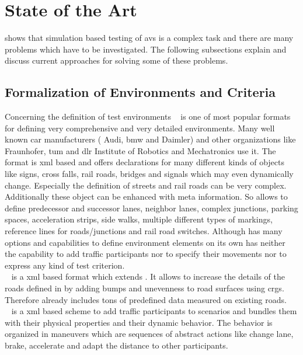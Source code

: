 \section{State of the Art}\label{sec:stateOfTheArt}
 shows that simulation based testing of \glspl{av} is a complex task and there are many problems which have to be investigated.
The following subsections explain and discuss current approaches for solving some of these problems.

\subsection{Formalization of Environments and Criteria}
Concerning the definition of test environments \opendrive{}~\cite{openDrive} is one of most popular formats for defining very comprehensive and very detailed environments.
Many well known car manufacturers (\eg{} Audi, \gls{bmw} and Daimler) and other organizations like Fraunhofer, \gls{tum} and \gls{dlr} Institute of Robotics and Mechatronics use it.
The format is \gls{xml} based and offers declarations for many different kinds of objects like signs, cross falls, rail roads, bridges and signals which may even dynamically change.
Especially the definition of streets and rail roads can be very complex.
Additionally these object can be enhanced with meta information.
So \opendrive{} allows to define predecessor and successor lanes, neighbor lanes, complex junctions, parking spaces, acceleration strips, side walks, multiple different types of markings, reference lines for roads/junctions and rail road switches.
Although \opendrive{} has many options and capabilities to define environment elements \opendrive{} on its own has neither the capability to add traffic participants nor to specify their movements nor to express any kind of test criterion.\\
\opencrg{}~\cite{openCrg} is a \gls{xml} based format which extends \opendrive{}.
It allows to increase the details of the roads defined in \opendrive{} by adding bumps and unevenness to road surfaces using \glspl{crg}.
Therefore \opencrg{} already includes tons of predefined data measured on existing roads.\\
\openscenario{}~\cite{openScenario} is a \gls{xml} based scheme to add traffic participants to \opendrive{} scenarios and bundles them with their physical properties and their dynamic behavior.
The behavior is organized in maneuvers which are sequences of abstract actions like change lane, brake, accelerate and adapt the distance to other participants.
